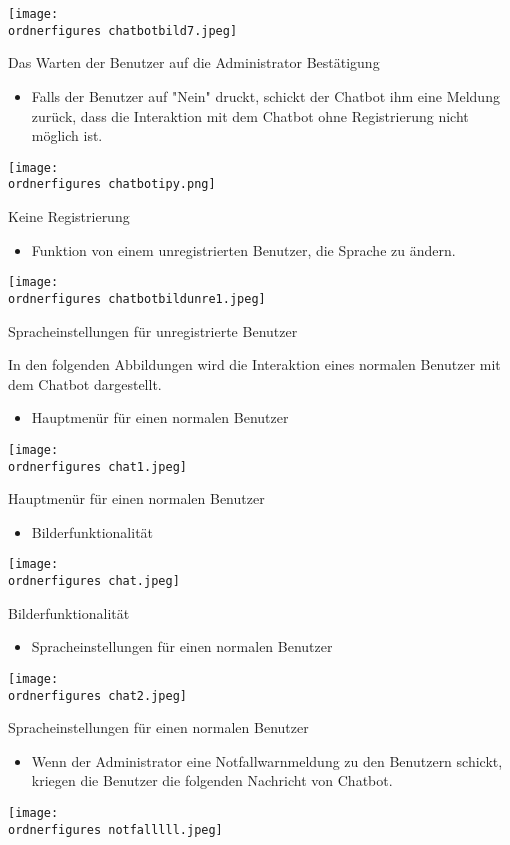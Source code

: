 \captionsetup{type=figure}
\texttt{[image: \\ordnerfigures chatbotbild7.jpeg]}
\caption{Das Warten der Benutzer auf die Administrator Bestätigung}
\label{fig:chat232bo53}
\begin{itemize}
	\item Falls der Benutzer auf "Nein" druckt, schickt der Chatbot ihm eine Meldung zur\"uck, dass die Interaktion mit dem Chatbot ohne Registrierung nicht m\"oglich ist.
\end{itemize}
\captionsetup{type=figure}
\texttt{[image: \\ordnerfigures chatbotipy.png]}
\caption{Keine Registrierung}
\label{fig:chatffd3}
\begin{itemize}
	\item Funktion von einem unregistrierten Benutzer, die Sprache zu \"andern.
\end{itemize}
\captionsetup{type=figure}
\texttt{[image: \\ordnerfigures chatbotbildunre1.jpeg]}
\caption{Spracheinstellungen f\"ur unregistrierte Benutzer}
\label{fig:chatfd3}
In den folgenden Abbildungen wird die Interaktion eines normalen Benutzer mit dem Chatbot dargestellt.
\begin{itemize}
	\item Hauptmen\"ur f\"ur einen normalen Benutzer
\end{itemize}
\captionsetup{type=figure}
\texttt{[image: \\ordnerfigures chat1.jpeg]}
\caption{Hauptmen\"ur f\"ur einen normalen Benutzer} 
\label{fig:chgtfd3}
\begin{itemize}
	\item Bilderfunktionalit\"at
\end{itemize}
\captionsetup{type=figure}
\texttt{[image: \\ordnerfigures chat.jpeg]}
\caption{Bilderfunktionalit\"at} 
\label{fig:chgtf53}
\begin{itemize}
	\item Spracheinstellungen f\"ur einen normalen Benutzer
\end{itemize}
\captionsetup{type=figure}
\texttt{[image: \\ordnerfigures chat2.jpeg]}
\caption{Spracheinstellungen f\"ur einen normalen Benutzer} 
\label{fig:chgtf43}
\begin{itemize}
	\item Wenn der Administrator eine Notfallwarnmeldung zu den Benutzern schickt, kriegen die Benutzer die folgenden Nachricht von Chatbot.
\end{itemize}
\captionsetup{type=figure}
\texttt{[image: \\ordnerfigures notfalllll.jpeg]}
